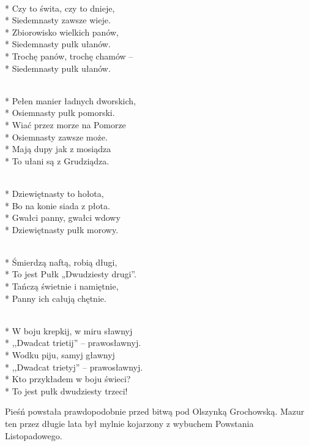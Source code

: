 \begin{lyrics}[longestline={\intertitle{1. Pułk Szwoleżerów J. Piłsudskiego}}]
\\*
\smallskip
Czy to świta, czy to dnieje,\\*
Siedemnasty zawsze wieje.\\*
\medskip
Zbiorowisko wielkich panów,\\*
Siedemnasty pułk ułanów.\\*
\medskip
Trochę panów, trochę chamów –\\*
Siedemnasty pułk ułanów.

\\*
\smallskip
Pełen manier ładnych dworskich,\\*
Osiemnasty pułk pomorski.\\*
\medskip
Wiać przez morze na Pomorze\\*
Osiemnasty zawsze może.\\*
\medskip
Mają dupy jak z mosiądza\\*
To ułani są z Grudziądza.

\\*
\smallskip
Dziewiętnasty to hołota,\\*
Bo na konie siada z płota.\\*
\medskip
Gwałci panny, gwałci wdowy\\*
Dziewiętnasty pułk morowy.

\\*
\smallskip
Śmierdzą naftą, robią długi,\\*
To jest Pułk „Dwudziesty drugi”.\\*
\medskip
Tańczą świetnie i namiętnie,\\*
Panny ich całują chętnie.

\\*
\smallskip
W boju krepkij, w miru sławnyj\\*
,,Dwadcat trietij'' – prawosławnyj.\\*
\medskip
Wodku piju, samyj gławnyj\\*
,,Dwadcat trietyj'' – prawosławnyj.\\*
\medskip
Kto przykładem w boju świeci?\\*
To jest pułk dwudziesty trzeci!
\end{lyrics}

\begin{info}Pieśń powstała prawdopodobnie przed bitwą pod Olszynką Grochowską. Mazur ten przez długie lata był mylnie kojarzony z wybuchem Powstania Listopadowego.\end{info}

